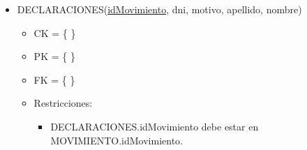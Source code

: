 \begin{itemize}
\item DECLARACIONES(\underline{idMovimiento}, dni, motivo, apellido, nombre)
	\begin{itemize}
		\item CK = \{ \}
		\item PK = \{ \}
		\item FK = \{ \}
		\item Restricciones:
			\begin{itemize}
			\item DECLARACIONES.idMovimiento debe estar en MOVIMIENTO.idMovimiento.
			\\
			\end{itemize}
	\end{itemize}
	
	
\end{itemize}		